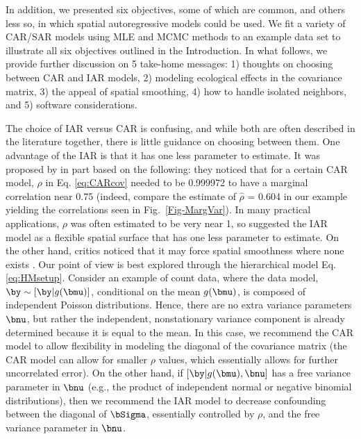 In addition, we presented six objectives, some of which are common, and others less so, in which spatial autoregressive models could be used. We fit a variety of CAR/SAR models using MLE and MCMC methods to an example data set to illustrate all six objectives outlined in the Introduction. In what follows, we provide further discussion on 5 take-home messages: 1) thoughts on choosing between CAR and IAR models, 2) modeling ecological effects in the covariance matrix, 3) the appeal of spatial smoothing, 4) how to handle isolated neighbors, and 5) software considerations.

The choice of IAR versus CAR is confusing, and while both are often described in the literature together, there is little guidance on choosing between them.  One advantage of the IAR is that it has one less parameter to estimate.  It was proposed by \citet{Besa:Koop:cond:1995} in part based on the following: they noticed that for a certain CAR model, $\rho$ in Eq. \ref{eq:CARcov} needed to be 0.999972 to have a marginal correlation near 0.75 (indeed, compare the estimate of $\hat{\rho}$ = 0.604 in our example yielding the correlations seen in Fig.~\ref{Fig-MargVar}). In many practical applications, $\rho$ was often estimated to be very near 1, so \citet{Besa:Koop:cond:1995} suggested the IAR model as a flexible spatial surface that has one less parameter to estimate.  On the other hand, critics noticed that it may force spatial smoothness where none exists \citep[e.g.,][]{Lero:Lei:Bres:esti:2000}. Our point of view is best explored through the hierarchical model Eq. \ref{eq:HMsetup}.  Consider an example of count data, where the data model, $\by \sim [\by|g(\bmu)]$, conditional on the mean $g(\bmu)$, is composed of independent Poisson distributions. Hence, there are no extra variance parameters $\bnu$, but rather the independent, nonstationary variance component is already determined because it is equal to the mean. In this case, we recommend the CAR model to allow flexibility in modeling the diagonal of the covariance matrix (the CAR model can allow for smaller $\rho$ values, which essentially allows for further uncorrelated error).  On the other hand, if $[\by|g(\bmu),\bnu]$ has a free variance parameter in $\bnu$ (e.g., the product of independent normal or negative binomial distributions), then we recommend the IAR model to decrease confounding between the diagonal of $\bSigma$, essentially controlled by $\rho$, and the free variance parameter in $\bnu$.

